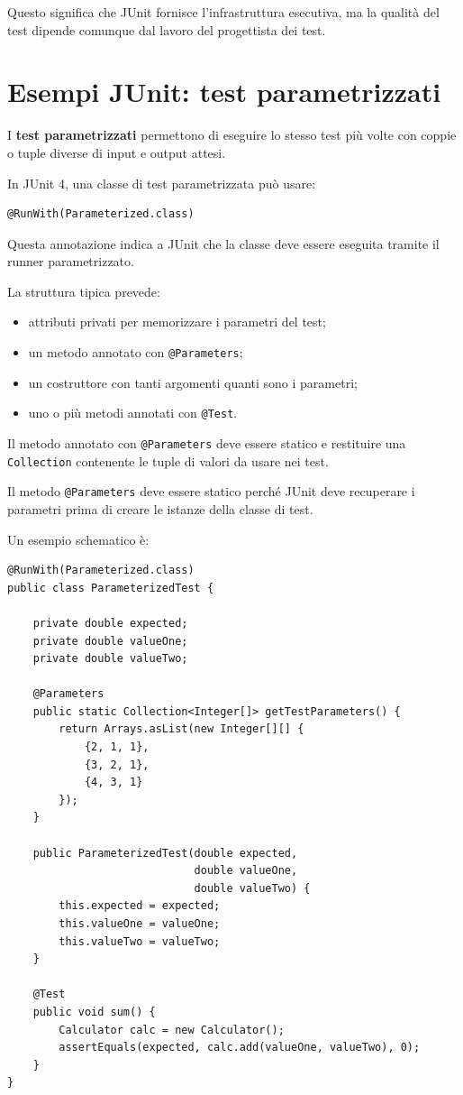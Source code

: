 Questo significa che JUnit fornisce l'infrastruttura esecutiva, ma la qualità del test dipende comunque dal lavoro del progettista dei test.

\section{Esempi JUnit: test parametrizzati}

I \textbf{test parametrizzati} permettono di eseguire lo stesso test più volte con coppie o tuple diverse di input e output attesi.

In JUnit 4, una classe di test parametrizzata può usare:

\begin{verbatim}
@RunWith(Parameterized.class)
\end{verbatim}

Questa annotazione indica a JUnit che la classe deve essere eseguita tramite il runner parametrizzato.

La struttura tipica prevede:

\begin{itemize}
    \item attributi privati per memorizzare i parametri del test;
    \item un metodo annotato con \texttt{@Parameters};
    \item un costruttore con tanti argomenti quanti sono i parametri;
    \item uno o più metodi annotati con \texttt{@Test}.
\end{itemize}

Il metodo annotato con \texttt{@Parameters} deve essere statico e restituire una \texttt{Collection} contenente le tuple di valori da usare nei test.

\begin{notaprof}
Il metodo \texttt{@Parameters} deve essere statico perché JUnit deve recuperare i parametri prima di creare le istanze della classe di test.
\end{notaprof}

Un esempio schematico è:

\begin{verbatim}
@RunWith(Parameterized.class)
public class ParameterizedTest {

    private double expected;
    private double valueOne;
    private double valueTwo;

    @Parameters
    public static Collection<Integer[]> getTestParameters() {
        return Arrays.asList(new Integer[][] {
            {2, 1, 1},
            {3, 2, 1},
            {4, 3, 1}
        });
    }

    public ParameterizedTest(double expected,
                             double valueOne,
                             double valueTwo) {
        this.expected = expected;
        this.valueOne = valueOne;
        this.valueTwo = valueTwo;
    }

    @Test
    public void sum() {
        Calculator calc = new Calculator();
        assertEquals(expected, calc.add(valueOne, valueTwo), 0);
    }
}
\end{verbatim}

